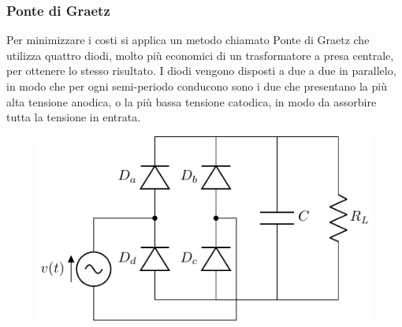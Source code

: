 \documentclass{article}
\numberwithin{equation}{subsection}
\begin{document}
\subsubsection{Ponte di Graetz}

Per minimizzare i costi si applica un metodo chiamato Ponte di Graetz che utilizza quattro diodi, molto più economici di un trasformatore a presa centrale, per ottenere lo 
stesso risultato. 
I diodi vengono disposti a due a due in parallelo, in modo che per ogni semi-periodo conducono sono i due che presentano la più alta tensione anodica, o la più bassa tensione 
catodica, in modo da assorbire tutta la tensione in entrata.  
\begin{figure}[H]%
    \centering
    \includegraphics{ponte-graetz.pdf}%
    \label{fig:ponte-graetz}
\end{figure}
\end{document}
